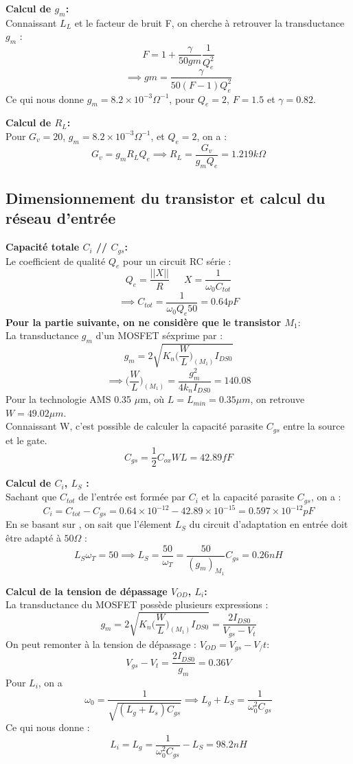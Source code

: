 \documentclass[a4paper]{article}
\begin{document}
\textbf{Calcul de $g_m$:}\\
Connaissant $L_L$ et le facteur de bruit F, on cherche \`a retrouver la transductance $g_m$ :
\[
  F = 1 + \frac{\gamma}{50 gm} \frac{1}{Q^2_e}
\]
\[
  \implies gm = \frac{\gamma}{50 (F-1) Q^2_e}
\]
Ce qui nous donne $g_m = 8.2 \times 10^{-3} \Omega^{-1}$, pour $Q_e = 2$, $F = 1.5$ et $\gamma = 0.82$.

\textbf{Calcul de $R_L$:}\\
Pour $G_v = 20$, $g_m = 8.2 \times 10^{-3} \Omega^{-1}$, et $Q_e = 2$, on a :
  \[
    G_v = g_m R_L Q_e \implies R_L = \frac{G_v}{g_m Q_e} = 1.219 k\Omega
  \]

\subsection{Dimensionnement du transistor et calcul du r\'eseau d'entr\'ee}
\textbf{Capacit\'e totale $C_i$ // $C_{gs}$:}\\
Le coefficient de qualit\'e $Q_e$ pour un circuit RC s\'erie :
\[
  Q_e = \frac{||X||}{R} \phantom{4}\phantom{4}\phantom{4} X = \frac{1}{\omega_0 C_{tot}}
\]
\[
\implies C_{tot} = \frac{1}{\omega_0 Q_e 50} = 0.64 pF
\]
\textbf{Pour la partie suivante, on ne consid\`ere que le transistor $M_1$}:\\
La transductance $g_m$ d'un MOSFET s\'exprime par :
\[
  g_m = 2\sqrt{K_n \bigg( \frac{W}{L} \bigg)_{(M_1)} I_{DS0}}
\]
\[
\implies \bigg(\frac{W}{L}\bigg)_{(M_1)}  = \frac{g^2_m}{4 k_n I_{DS0}} = 140.08
\]
Pour la technologie AMS 0.35 $\mu$m, o\`u $L = L_{min} = 0.35 \mu m$, on retrouve $W = 49.02 \mu m$.\\
Connaissant W, c'est possible de calculer la capacit\'e parasite $C_{gs}$ entre la source et le gate.
\[
C_{gs} = \frac{1}{2} C_{ox} W L = 42.89 fF
\]

\textbf{Calcul de $C_i$, $L_S$ :}\\
Sachant que $C_{tot}$ de l'entr\'ee est form\'ee par $C_i$ et la capacit\'e parasite $C_{gs}$, on a :
\[
  C_i = C_{tot} - C_{gs} = 0.64\times 10^{-12} - 42.89 \times 10^{-15} = 0.597 \times 10^{-12} pF
\]
En se basant sur \cite{RFIC-cours}, on sait que l'\'element $L_S$ du circuit d'adaptation en entr\'ee
doit \^etre adapt\'e \`a $50 \Omega$ :
\[
  L_S \omega_T = 50 \implies L_S = \frac{50}{\omega_T} = \frac{50}{(g_m)_{M_1}}C_{gs} = 0.26 nH
\]

\clearpage
\textbf{Calcul de la tension de d\'epassage $V_{OD}$, $L_i$:}\\
La transductance du MOSFET poss\`ede plusieurs expressions :
\[
  g_m = 2\sqrt{K_n \bigg( \frac{W}{L} \bigg)_{(M_1)} I_{DS0}} = \frac{2 I_{DS0}}{V_{gs} - V_{t}}
\]
On peut remonter \`a la tension de d\'epassage : $V_{OD} = V_{gs} - V_/{t}$:
\[
  V_{gs} - V_{t} = \frac{2 I_{DS0}}{g_m} = 0.36 V
\]
Pour $L_i$, on a
\[
  \omega_0 = \frac{1}{\sqrt{(L_g + L_s) C_{gs}}} \implies L_g + L_S = \frac{1}{\omega^2_0 C_{gs}}
\]
Ce qui nous donne :
\[
  L_i = L_g = \frac{1}{\omega^2_0 C_{gs}} - L_{S} = 98.2 nH
\]
\end{document}
